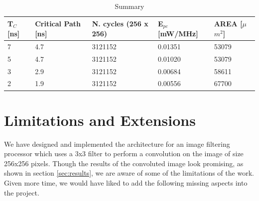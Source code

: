 \documentclass[11pt,a4paper]{article}
\begin{document}
\begin{table}[h]
	\caption{Summary}
	\begin{center}
		\begin{tabular}{|p{1cm}|p{2cm}|p{2cm}|l|l|} \hline
			\textbf{T}$_C$ [ns] & \textbf{Critical Path} [ns] & \textbf{N. cycles} (256 x 256) & \textbf{E}$_{pc}$ [mW/MHz] & \textbf{AREA} [$\mu$$m^2$] \\ \hline
			7 & 4.7 & 3121152 & 0.01351 & 53079 \\ \hline
			5 & 4.7 & 3121152 & 0.01020 & 53079 \\ \hline
			3 & 2.9 & 3121152 & 0.00684 & 58611 \\ \hline
			2 & 1.9 & 3121152 & 0.00556 & 67700 \\ \hline
		
		\end{tabular}
	\end{center}
	\label{tab:conclusion}
\end{table}


\section{Limitations and Extensions}
\label{sec:limitations}

We have designed and implemented the architecture for an image filtering processor which uses a 3x3 filter to perform a convolution on the image of size 256x256 pixels. Though the results of the convoluted image look promising, as shown in section \ref{sec:results}, we are aware of some of the limitations of the work. Given more time, we would have liked to add the following missing aspects into the project.
\end{document}
